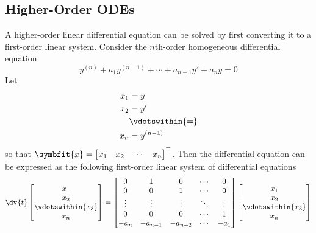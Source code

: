 \documentclass{article}
\begin{document}
\subsection{Higher-Order ODEs}
A higher-order linear differential equation can be solved by first converting it to a first-order linear
system. Consider the \(n\)th-order homogeneous differential equation
\begin{equation*}
    y^{\left( n \right)} + a_1 y^{\left( n-1 \right)} + \cdots + a_{n-1} y' + a_n y = 0
\end{equation*}
Let
\begin{align*}
    x_1 & = y                      \\
    x_2 & = y'                     \\
        & \vdotswithin{=}          \\
    x_n & = y^{\left( n-1 \right)}
\end{align*}
so that \(\symbfit{x}=\begin{bmatrix}x_1 & x_2 & \cdots & x_n\end{bmatrix}^\top \). Then the differential equation can
be expressed as the following first-order linear system of differential equations
\begin{equation*}
    \dv{t} \begin{bmatrix}
        x_1               \\
        x_2               \\
        \vdotswithin{x_3} \\
        x_n
    \end{bmatrix} = \begin{bmatrix}
        0      & 1        & 0        & \cdots & 0      \\
        0      & 0        & 1        & \cdots & 0      \\
        \vdots & \vdots   & \vdots   & \ddots & \vdots \\
        0      & 0        & 0        & \cdots & 1      \\
        -a_n   & -a_{n-1} & -a_{n-2} & \cdots & -a_1
    \end{bmatrix} \begin{bmatrix}
        x_1               \\
        x_2               \\
        \vdotswithin{x_3} \\
        x_n
    \end{bmatrix}
\end{equation*}
\end{document}
